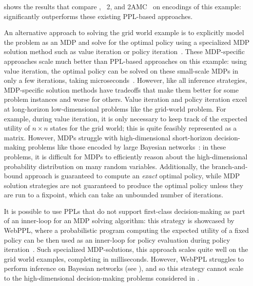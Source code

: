  shows the results that compare \dappl{}, \problog{}~2, and
2AMC~\citep{derkinderen2020algebraic} on encodings of this example: \dappl{}
significantly outperforms these existing PPL-based approaches.

An alternative approach to solving the grid world example is to explicitly model
the problem as an MDP and solve for the optimal policy using a specialized MDP
solution method such as value iteration or policy
iteration~\citep{sutton2018reinforcement}. These MDP-specific approaches scale
much better than PPL-based approaches on this example: using value iteration,
the optimal policy can be solved on these small-scale MDPs in only a few
iterations, taking microseconds~\citep[Ch.  17]{russell2016artificial}.
However, like all inference strategies, MDP-specific solution methods have
tradeoffs that make them better for some problem instances and worse for others.
Value iteration and policy iteration excel at long-horizon low-dimensional
problems like the grid-world problem. For example, during value iteration, it is
only necessary to keep track of the expected utility of $n \times n$ states for
the grid world; this is quite feasibly represented as a matrix. However, MDPs struggle with
high-dimensional short-horizon decision-making
problems like those encoded by large Bayesian networks~\citep{holtzen2021model}:
in these problems, it is difficult for MDPs to efficiently reason about the
high-dimensional probability distribution on many random variables.
Additionally, the branch-and-bound approach is guaranteed to compute an
\emph{exact} optimal policy, while MDP solution strategies are not guaranteed to
produce the optimal policy unless they are run to a fixpoint, which can take an
unbounded number of iterations.

It is possible to use PPLs that do not support first-class decision-making as
part of an inner-loop for an MDP solving algorithm: this strategy is showcased
by WebPPL, where a probabilistic program computing the expected
utility of a fixed policy can be then used as an inner-loop for policy
evaluation during policy iteration~\citep{agentmodeling,dippl}. Such
specialized MDP-solutions, this approach scales quite well on the grid world
examples, completing in milliseconds.  However, WebPPL struggles to perform
inference on Bayesian networks (see \citet[Fig. 10]{holtzen2020scaling}), and so
this strategy cannot scale to the high-dimensional decision-making problems
considered in .
